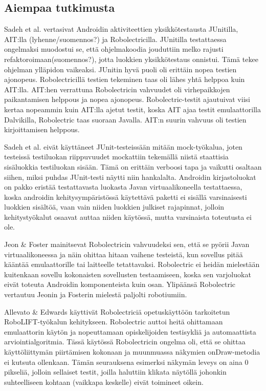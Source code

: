 \subsection{Aiempaa tutkimusta}

Sadeh et al. vertasivat Androidin aktiviteettien yksikkötestausta JUnitilla, AIT:lla (lyhenne/suomennos?) ja Robolectricilla. JUnitilla testattaessa ongelmaksi muodostui se, että ohjelmakoodia jouduttiin melko rajusti refaktoroimaan(suomennos?), jotta luokkien yksikkötestaus onnistui. Tämä tekee ohjelman ylläpidon vaikeaksi. JUnitin hyvä puoli oli erittäin nopea testien ajonopeus. Robolectricillä testien tekeminen taas oli lähes yhtä helppoa kuin AIT:lla. AIT:hen verrattuna Robolectricin vahvuudet oli virhepaikkojen paikantamisen helppous ja nopea ajonopeus. Robolectric-testit ajautuivat viisi kertaa nopeammin kuin AIT:lla ajetut testit, koska AIT ajaa testit emulaattorilla Dalvikilla, Robolectric taas suoraan Javalla. AIT:n suurin vahvuus oli testien kirjoittamisen helppous.\cite{sadehetal11}

Sadeh et al. eivät käyttäneet JUnit-testeissään mitään mock-työkalua, joten testeissä testiluokan riippuvuudet mockattiin tekemällä niistä staattisia sisäluokkia testiluokan sisään. Tämä on erittäin verboosi tapa ja vaikutti osaltaan siihen, miksi puhdas JUnit-testi näytti niin hankalalta. Androidin kirjastoluokat on pakko eristää testattavasta luokasta Javan virtuaalikoneella testattaessa, koska androidin kehitysympäristössä käytettävä paketti ei sisällä varsinaisesti luokkien sisältöä, vaan vain niiden luokkien julkiset rajapinnat, jolloin kehitystyökalut osaavat auttaa niiden käytössä, mutta varsinaista toteutusta ei ole.

Jeon \& Foster mainitsevat Robolectricin vahvuudeksi sen, että se pyörii Javan virtuaalikoneessa ja näin ohittaa hitaan vaihene testeistä, kun sovellus pitää kääntää emulaattorille tai laitteelle tetattavaksi. Robolectric ei heidän mielestään kuitenkaan sovellu kokonaisten sovellusten testaamiseen, koska sen varjoluokat eivät toteuta Androidin komponenteista kuin osan. Ylipäänsä Robolectric vertautuu Jeonin ja Fosterin mielestä paljolti robotiumiin. \cite{troyd}

Allevato \& Edwards käyttivät Robolectriciä opetuskäyttöön tarkoitetun RoboLIFT-työkalun kehitykseen. Robolectric auttoi heitä ohittamaan emulaattorin käytön ja nopeuttamaan opiskelijoiden testisykliä ja automaattista arviointialgoritmia. Tässä käytössä Robolectricin ongelma oli, että se ohittaa käyttöliittymän piirtämisen kokonaan ja muunmuassa näkymien onDraw-metodia ei kutsuta ollenkaan. Tämän seurauksena esimerksi näkymän leveys on aina 0 pikseliä, jolloin sellaiset testit, joilla haluttiin klikata näytöllä johonkin suhteelliseen kohtaan (vaikkapa keskelle) eivät toimineet oikein. \cite{robolift}

